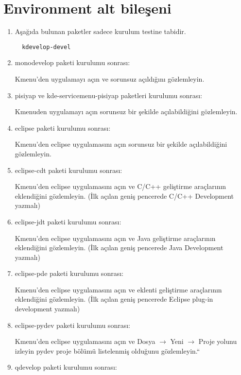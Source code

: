 \documentclass[a4paper,10pt]{article}
\begin{document}
\section{Environment alt bileşeni}
\begin{enumerate}

\item Aşağıda bulunan paketler sadece kurulum testine tabidir.

 \begin{verbatim}
  kdevelop-devel
 \end{verbatim}
\item monodevelop paketi kurulumu sonrası:

Kmenu'den uygulamayı açın ve sorunsuz açıldığını gözlemleyin.

\item pisiyap ve kde-servicemenu-pisiyap paketleri kurulumu sonrası:

Kmenuden uygulamayı açın sorunsuz bir şekilde açılabildiğini gözlemleyin.

\item eclipse paketi kurulumu sonrası:

Kmenu'den eclipse uygulamasını açın sorunsuz bir şekilde açılabildiğini gözlemleyin.

\item eclipse-cdt paketi kurulumu sonrası:

Kmenu'den eclipse uygulamasını açın ve C/C++ geliştirme araçlarının eklendiğini gözlemleyin. (İlk açılan geniş pencerede C/C++ Development yazmalı)

\item eclipse-jdt paketi kurulumu sonrası:

Kmenu'den eclipse uygulamasını açın ve Java geliştirme araçlarının eklendiğini gözlemleyin. (İlk açılan geniş pencerede Java Development yazmalı)

\item eclipse-pde paketi kurulumu sonrası:

Kmenu'den eclipse uygulamasını açın ve eklenti geliştirme araçlarının eklendiğini gözlemleyin. (İlk açılan geniş pencerede Eclipse plug-in development yazmalı)

\item eclipse-pydev paketi kurulumu sonrası:

Kmenu'den eclipse uygulamasını açın ve Dosya $\rightarrow$ Yeni $\rightarrow$ Proje yolunu izleyin pydev proje bölümü listelenmiş olduğunu gözlemleyin.``

\item qdevelop paketi kurulumu sonrası:


\end{enumerate}
\end{document}
